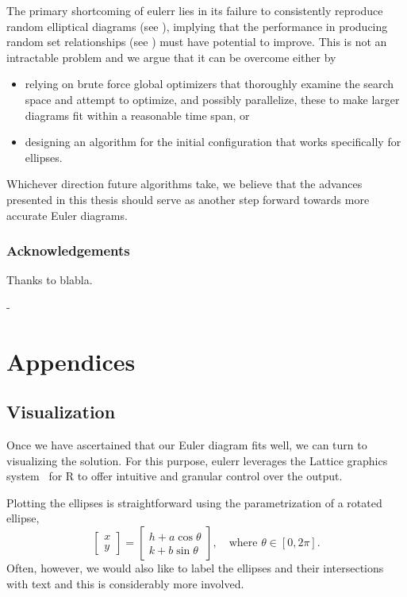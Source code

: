 \documentclass[
  oneside,
  openany,
  numbers=noendperiod,
  parskip=half,
  bibliography=totoc
]{scrbook}\usepackage[]{graphicx}\usepackage{xcolor}
\newlength{\overhang}
\newenvironment{fullwidth}{
  \begin{addmargin*}[0em]{-\overhang}
  }{
  \end{addmargin*}
}
\newcommand{\pkg}[1]{{\fontseries{b}\selectfont #1}}
\begin{document}
The primary shortcoming of \pkg{eulerr} lies in its failure to consistently
reproduce random elliptical diagrams (see ), implying that the
performance in producing random set relationships (see )
must have potential to improve. This is not an intractable problem and we
argue that it can be overcome either by
\begin{itemize}
\item relying on brute force global optimizers that thoroughly examine
the search space and attempt to optimize, and possibly parallelize,
these to make larger diagrams fit within a reasonable time span, or
\item designing an algorithm for the initial configuration that works specifically for
ellipses.
\end{itemize}
Whichever direction future algorithms take, we believe that the advances
presented in this thesis should serve as another step forward towards more
accurate Euler diagrams.

\section{Acknowledgements}
\label{sec:acknowledgements}

Thanks to blabla.

\begin{fullwidth}
\part*{Appendices}
\end{fullwidth}
\appendix
\chapter{Visualization}
\label{ap:visualization}

Once we have ascertained that our Euler diagram fits well, we can turn to
visualizing the solution. For this purpose, \pkg{eulerr} leverages the
\pkg{Lattice} graphics system~\citep{Sarkar_2008} for R to offer intuitive and
granular control over the output.

Plotting the ellipses is straightforward using the parametrization of a rotated
ellipse,
%
\begin{equation*}
\begin{bmatrix}
  x \\ y
\end{bmatrix} =
\begin{bmatrix}
  h + a \cos{\theta} \\
  k + b \sin{\theta}
\end{bmatrix},\quad \text{where } \theta \in [0, 2\pi].
\end{equation*}
%
Often, however, we would also like to label the ellipses and their intersections
with text and this is considerably more involved.
\end{document}
